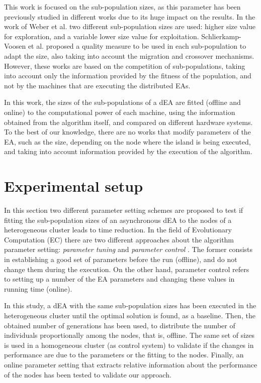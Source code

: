 \documentclass[final,1p,times]{elsarticle}
\begin{document}
This work is focused on the sub-population sizes, as this parameter has been previously studied in different works due to its huge impact on the results. In the work of Weber et al. \cite{DifferentialWeber09} two different sub-population sizes are used: higher size value for exploration, and a variable lower size value for exploitation. Schlierkamp-Voosen et al. \cite{AdaptationSizesSchlierkamp96} proposed a quality measure to be used in each sub-population to adapt the size, also taking into account the migration and crossover mechanisms. However, these works are based on the competition of sub-populations, taking into account only the information provided by the fitness of the population, and not by the machines that are executing the distributed EAs.


In this work, the sizes of the sub-populations of a dEA are fitted (offline and online) to the computational power of each machine, using the information obtained from the algorithm itself, and compared on different hardware systems.
 To the best of our knowledge, there are no works that
 modify parameters of the EA, such as the size, depending on the
 node where the island is being executed, and taking into account information provided by the execution of the algorithm. 


 


\section{Experimental setup}
\label{sec:experiments}
In this section two different parameter setting schemes are proposed to test if fitting the sub-population sizes of an asynchronous dEA to the nodes of a  heterogeneous cluster leads to time reduction. In the field of  Evolutionary Computation (EC) there are two different approaches about the algorithm parameter setting: {\em parameter tuning} and {\em parameter control} \cite{PARAMETERTUNING}. The former consists in establishing a good set of parameters before the run (offline), and do not change them during the execution. On the other hand, parameter control refers to setting up a number of  the EA parameters  and changing these values in running time (online). 

In this study, a dEA with the same sub-population sizes  has been executed in the heterogeneous cluster until the optimal solution is found, as a baseline. Then, the obtained number of generations has been used, to  distribute the number of individuals proportionally among the nodes, that is, offline. The same set of sizes is used in a homogeneous cluster (as control system) to validate if the changes in performance are due to the parameters or the fitting to the nodes. Finally, an online parameter setting that extracts relative information about the performance of the nodes has been tested to validate our approach. 
\end{document}
